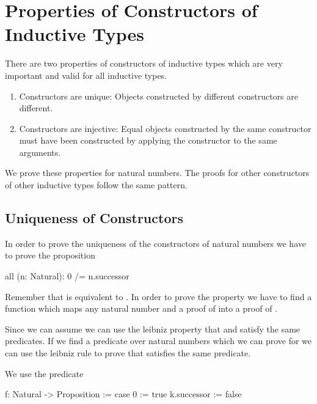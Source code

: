 \vskip 5mm
\section{Properties of Constructors of Inductive Types}

There are two properties of constructors of inductive types which are very
important and valid for all inductive types.

\begin{enumerate}

\item Constructors are unique: Objects constructed by
different constructors are different.

\item Constructors are injective: Equal objects constructed by the same
constructor must have been constructed by applying the constructor to the same
arguments.

\end{enumerate}

We prove these properties for natural numbers. The proofs for other constructors
of other inductive types follow the same pattern.




\subsection{Uniqueness of Constructors}

In order to prove the uniqueness of the constructors of natural numbers we have
to prove the proposition

\begin{alba}
    all (n: Natural): 0 /= n.successor
\end{alba}

Remember that  is equivalent to . In order to prove the property we have to find a function which
maps any natural number  and a proof of  into a
proof of .

Since we can assume  we can use the leibniz property that
 and  satisfy the same predicates. If we find a
predicate over natural numbers which we can prove for  we can use the
leibniz rule to prove that  satisfies the same predicate.

We use the predicate
\begin{alba}
    f: Natural -> Proposition :=
        case
            0 :=
                true
            k.successor :=
                false
\end{alba}

